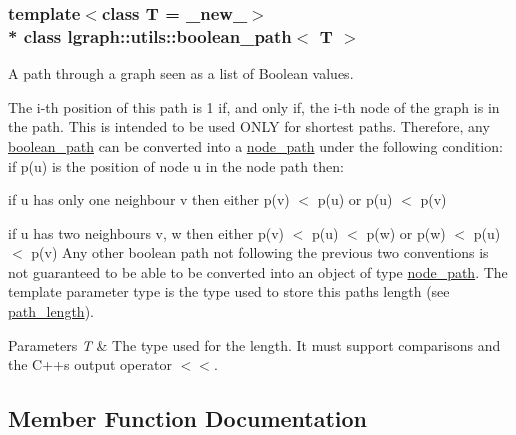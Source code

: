 \subsubsection*{template$<$class T = \+\_\+new\+\_\+$>$\\*
class lgraph\+::utils\+::boolean\+\_\+path$<$ T $>$}

A path through a graph seen as a list of Boolean values. 

The i-\/th position of this path is 1 if, and only if, the i-\/th node of the graph is in the path. This is intended to be used O\+N\+LY for shortest paths. Therefore, any \hyperlink{classlgraph_1_1utils_1_1boolean__path}{boolean\+\_\+path} can be converted into a \hyperlink{classlgraph_1_1utils_1_1node__path}{node\+\_\+path} under the following condition\+: if p(u) is the position of node \textquotesingle{}u\textquotesingle{} in the node path then\+:
\begin{DoxyItemize}
\item if u has only one neighbour \textquotesingle{}v\textquotesingle{} then either p(v) $<$ p(u) or p(u) $<$ p(v)
\item if u has two neighbours \textquotesingle{}v\textquotesingle{}, \textquotesingle{}w\textquotesingle{} then either p(v) $<$ p(u) $<$ p(w) or p(w) $<$ p(u) $<$ p(v) Any other boolean path not following the previous two conventions is not guaranteed to be able to be converted into an object of type \textquotesingle{}\hyperlink{classlgraph_1_1utils_1_1node__path}{node\+\_\+path}\textquotesingle{}. The template parameter type is the type used to store this path\textquotesingle{}s length (see \hyperlink{classlgraph_1_1utils_1_1boolean__path_a35ff8125a2ef2418feb576d2fe528517}{path\+\_\+length}).
\end{DoxyItemize}


\begin{DoxyParams}{Parameters}
{\em T} & The type used for the length. It must support comparisons and the C++\textquotesingle{}s output operator $<$$<$. \\
\hline
\end{DoxyParams}


\subsection{Member Function Documentation}
